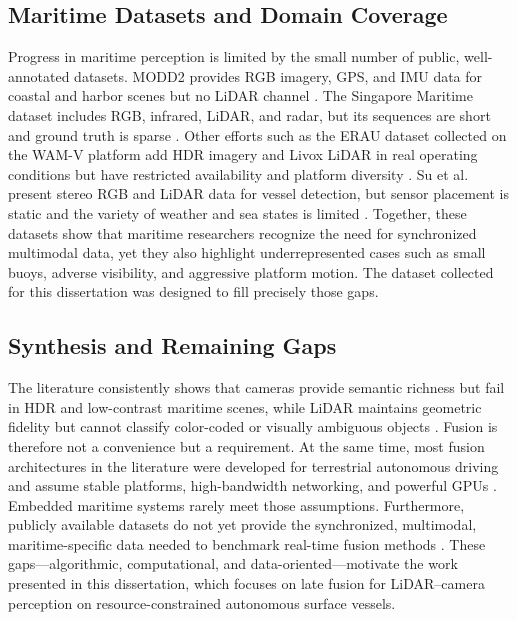 \documentclass[../main.tex]{subfiles}
\begin{document}
\subsection{Maritime Datasets and Domain Coverage}
Progress in maritime perception is limited by the small number of public, well-annotated datasets. MODD2 provides RGB imagery, GPS, and IMU data for coastal and harbor scenes but no LiDAR channel \cite{bovcon2020}. The Singapore Maritime dataset includes RGB, infrared, LiDAR, and radar, but its sequences are short and ground truth is sparse \cite{jun-hwa2022}. Other efforts such as the ERAU dataset collected on the WAM-V platform add HDR imagery and Livox LiDAR in real operating conditions but have restricted availability and platform diversity \cite{thompson2023}. Su et al. present stereo RGB and LiDAR data for vessel detection, but sensor placement is static and the variety of weather and sea states is limited \cite{su2023}. Together, these datasets show that maritime researchers recognize the need for synchronized multimodal data, yet they also highlight underrepresented cases such as small buoys, adverse visibility, and aggressive platform motion. The dataset collected for this dissertation was designed to fill precisely those gaps.

\subsection{Synthesis and Remaining Gaps}
The literature consistently shows that cameras provide semantic richness but fail in HDR and low-contrast maritime scenes, while LiDAR maintains geometric fidelity but cannot classify color-coded or visually ambiguous objects \cite{bovcon2020, prasad2017, yeong2021}. Fusion is therefore not a convenience but a requirement. At the same time, most fusion architectures in the literature were developed for terrestrial autonomous driving and assume stable platforms, high-bandwidth networking, and powerful GPUs \cite{liang2022, xu2023, qi2021}. Embedded maritime systems rarely meet those assumptions. Furthermore, publicly available datasets do not yet provide the synchronized, multimodal, maritime-specific data needed to benchmark real-time fusion methods \cite{thompson2023, su2023}. These gaps—algorithmic, computational, and data-oriented—motivate the work presented in this dissertation, which focuses on late fusion for LiDAR–camera perception on resource-constrained autonomous surface vessels.
\end{document}
